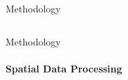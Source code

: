\documentclass{beamer}
\begin{document}
\begin{frame}{Methodology}
\begin{columns}
\begin{column}{0.5\textwidth}
\begin{center}
     \end{center}
\end{column}
\end{columns}


    
\end{frame}


\begin{frame}{Methodology}
\framesubtitle{Spatial Data Processing}

\begin{figure}%
\hfill
{}
\hfill

\end{figure}
\end{frame}
\end{document}
